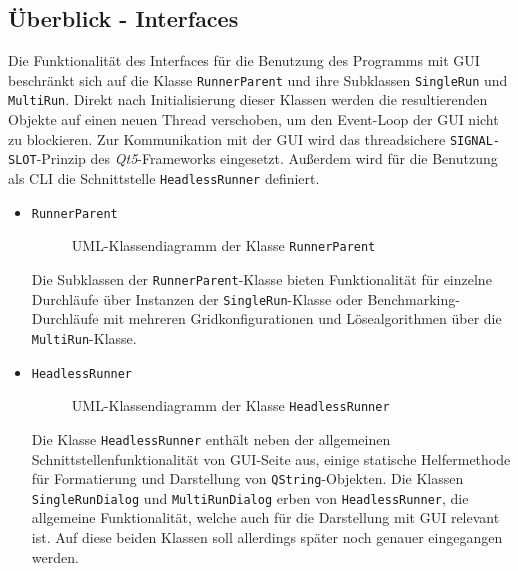 \subsection{Überblick - Interfaces}
\label{subsec:aufbau_frontend_ueberblick_interfaces}
Die Funktionalität des Interfaces für die Benutzung des Programms mit \ac{GUI} beschränkt sich auf die Klasse \texttt{RunnerParent}
und ihre Subklassen \texttt{SingleRun} und \texttt{MultiRun}.
Direkt nach Initialisierung dieser Klassen werden die resultierenden Objekte auf einen neuen Thread verschoben, um den Event-Loop der \ac{GUI} nicht zu blockieren.
Zur Kommunikation mit der \ac{GUI} wird das threadsichere \texttt{SIGNAL-SLOT}-Prinzip \cite{Qt52024} des \textit{Qt5}-Frameworks eingesetzt.
Außerdem wird für die Benutzung als \ac{CLI} die Schnittstelle \texttt{HeadlessRunner} definiert.
\begin{itemize}
    \item \texttt{RunnerParent}\\
    \begin{figure}[H]
        \vspace{-0.5cm}
        \centering
        
        \caption{UML-Klassendiagramm der Klasse \texttt{RunnerParent}}
        \label{fig:uml_runner_parent}
    \end{figure}
    Die Subklassen der \texttt{RunnerParent}-Klasse bieten Funktionalität für einzelne Durchläufe über Instanzen der \texttt{SingleRun}-Klasse
    oder Benchmarking-Durchläufe mit mehreren Gridkonfigurationen und Lösealgorithmen über die \texttt{MultiRun}-Klasse.
    \item \texttt{HeadlessRunner}\\
    \begin{figure}[H]
        \vspace{-0.5cm}
        \centering
        
        \caption{UML-Klassendiagramm der Klasse \texttt{HeadlessRunner}}
        \label{fig:uml_headlessRunner}
    \end{figure}
    Die Klasse \texttt{HeadlessRunner} enthält neben der allgemeinen Schnittstellenfunktionalität von \ac{GUI}-Seite aus,
    einige statische Helfermethode für Formatierung und Darstellung von \texttt{QString}-Objekten.
    Die Klassen \texttt{SingleRunDialog} und \texttt{MultiRunDialog} erben von \texttt{HeadlessRunner}, die allgemeine Funktionalität,
    welche auch für die Darstellung mit \ac{GUI} relevant ist.
    Auf diese beiden Klassen soll allerdings später noch genauer eingegangen werden.
\end{itemize}